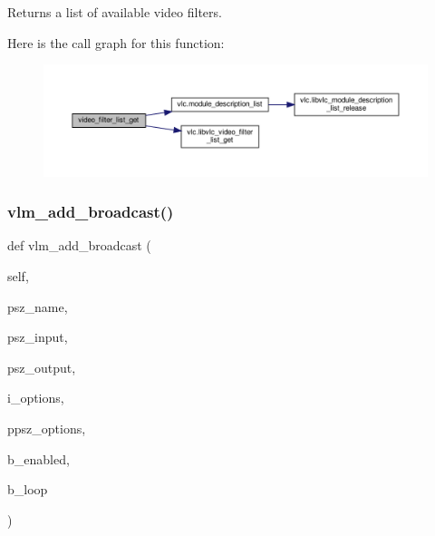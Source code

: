 \begin{DoxyVerb}Returns a list of available video filters.\end{DoxyVerb}
 Here is the call graph for this function\+:
\nopagebreak
\begin{figure}[H]
\begin{center}
\leavevmode
\includegraphics[width=350pt]{classvlc_1_1_instance_a72cb3f80f491fa38104614e5966cc396_cgraph}
\end{center}
\end{figure}
\mbox{\label{classvlc_1_1_instance_a8ce4b26858673c7029810ca9c99b4e83}} 
\subsubsection{\texorpdfstring{vlm\+\_\+add\+\_\+broadcast()}{vlm\_add\_broadcast()}}
{\footnotesize\ttfamily def vlm\+\_\+add\+\_\+broadcast (\begin{DoxyParamCaption}\item[{}]{self,  }\item[{}]{psz\+\_\+name,  }\item[{}]{psz\+\_\+input,  }\item[{}]{psz\+\_\+output,  }\item[{}]{i\+\_\+options,  }\item[{}]{ppsz\+\_\+options,  }\item[{}]{b\+\_\+enabled,  }\item[{}]{b\+\_\+loop }\end{DoxyParamCaption})}

